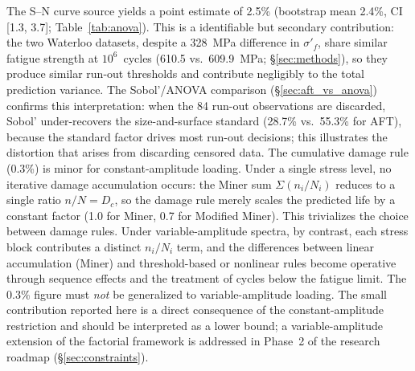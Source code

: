 \documentclass[twocolumn,12pt,a4paper]{article}
\begin{document}
The S--N curve source yields a point estimate of 2.5\% (bootstrap
mean 2.4\%, CI [1.3, 3.7]; Table~\ref{tab:anova}). This is a
identifiable but secondary contribution: the two Waterloo
datasets, despite a 328~MPa difference in $\sigma'_f$, share similar
fatigue strength at $10^6$~cycles (610.5 vs.\ 609.9~MPa; \S\ref{sec:methods}),
so they produce similar run-out thresholds and contribute negligibly
to the total prediction variance. The Sobol'/ANOVA comparison
(\S\ref{sec:aft_vs_anova}) confirms this interpretation: when the 84
run-out observations are discarded, Sobol' under-recovers the
size-and-surface standard (28.7\% vs.\ 55.3\% for AFT), because the
standard factor drives most run-out decisions; this illustrates the
distortion that arises from discarding censored data. The cumulative
damage rule
(0.3\%) is minor for constant-amplitude loading. Under a single
stress level,
no iterative damage accumulation occurs: the Miner sum
$\Sigma(n_i/N_i)$ reduces to a single ratio $n/N = D_c$, so the
damage rule merely scales the predicted life by a constant factor
(1.0 for Miner, 0.7 for Modified Miner). This trivializes the
choice between damage rules. Under variable-amplitude spectra,
by contrast, each stress block contributes a distinct $n_i/N_i$
term, and the differences between linear accumulation (Miner) and
threshold-based or nonlinear rules become operative through sequence
effects and the treatment of cycles below the fatigue limit. The
0.3\% figure must \emph{not} be generalized to
variable-amplitude loading.
The small contribution reported here is a direct consequence of
the constant-amplitude restriction and should be interpreted as a
lower bound; a variable-amplitude extension of the factorial
framework is addressed in Phase~2 of the research roadmap (\S\ref{sec:constraints}).
\end{document}
